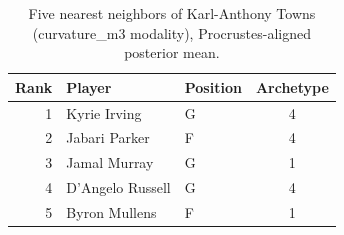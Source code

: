 \begin{table}[htbp]
  \centering\small
  \begin{tabular}{rllc}
    \toprule
    Rank & Player & Position & Archetype \\
    \midrule
    1 & Kyrie Irving & G & 4 \\
    2 & Jabari Parker & F & 4 \\
    3 & Jamal Murray & G & 1 \\
    4 & D'Angelo Russell & G & 4 \\
    5 & Byron Mullens & F & 1 \\
    \bottomrule
  \end{tabular}
  \caption{Five nearest neighbors of Karl-Anthony Towns (curvature_m3 modality), Procrustes-aligned posterior mean.}
  \label{tab:Karl_Anthony_Towns_neighbors_curvature_m3}
\end{table}

